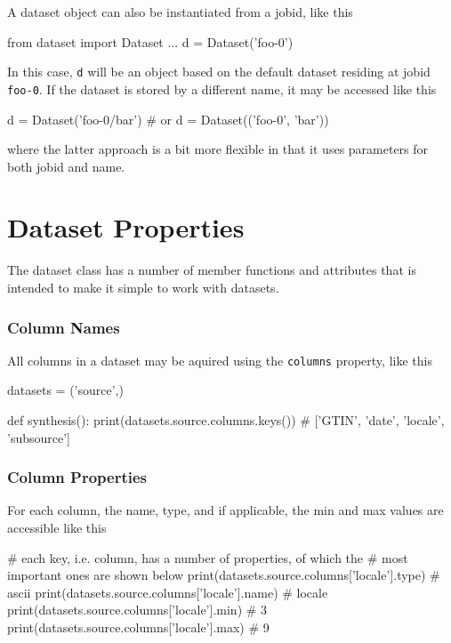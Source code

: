 A dataset object can also be instantiated from a jobid, like this

\begin{python}
from dataset import Dataset
...
d = Dataset('foo-0')
\end{python}
In this case, \texttt{d} will be an object based on the default
dataset residing at jobid \texttt{foo-0}.  If the dataset is stored by
a different name, it may be accessed like this

\begin{python}
d = Dataset('foo-0/bar')
# or
d = Dataset(('foo-0', 'bar'))
\end{python}
where the latter approach is a bit more flexible in that it uses
parameters for both jobid and name.




\newpage
\section{Dataset Properties}

The dataset class has a number of member functions and attributes that
is intended to make it simple to work with datasets.



\subsubsection{Column Names}

All columns in a dataset may be aquired using the \texttt{columns} property, like this

\begin{python}
datasets = ('source',)

def synthesis():
  print(datasets.source.columns.keys())
  # ['GTIN', 'date', 'locale', 'subsource']
\end{python}



\subsubsection{Column Properties}

For each column, the name, type, and if applicable, the min and max
values are accessible like this

\begin{python}
# each key, i.e. column, has a number of properties, of which the
# most important ones are shown below
print(datasets.source.columns['locale'].type)
# ascii
print(datasets.source.columns['locale'].name)
# locale
print(datasets.source.columns['locale'].min)
# 3
print(datasets.source.columns['locale'].max)
# 9
\end{python}

